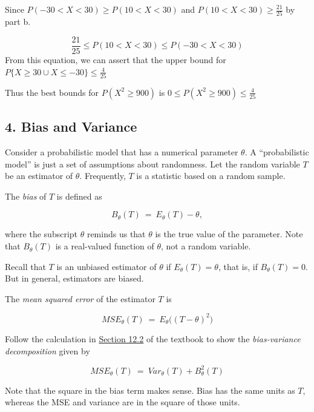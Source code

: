 \documentclass[11pt]{article}
\begin{document}
Since $ P(-30 < X < 30) \ge P(10 < X < 30) $ and $P(10 < X < 30) \ge \frac{21}{25}$ by part b. 

\[
\frac{21}{25} \le P(10 < X < 30) \le P(-30 < X < 30)
\]
From this equation, we can assert that the upper bound for $ P\{X\ge30\cup X \le -30\} \le \frac{4}{25} $ 


Thus the best bounds for $ P(X^{2} \ge 900) $ is $ \boxed{0 \le P(X^{2}\ge 900) \le \frac{4}{25}} $  
    \newpage

    \subsection*{4. Bias and Variance}\label{bias-and-variance}

Consider a probabilistic model that has a numerical parameter
\(\theta\). A ``probabilistic model'' is just a set of assumptions about
randomness. Let the random variable \(T\) be an estimator of \(\theta\).
Frequently, \(T\) is a statistic based on a random sample.

The \emph{bias} of \(T\) is defined as

\[
B_\theta (T) ~ = ~ E_\theta (T) - \theta,
\]

where the subscript \(\theta\) reminds us that \(\theta\) is the true
value of the parameter. Note that \(B_\theta(T)\) is a real-valued
function of \(\theta\), not a random variable.

Recall that \(T\) is an unbiased estimator of \(\theta\) if
\(E_\theta(T) = \theta\), that is, if \(B_\theta(T) = 0\). But in
general, estimators are biased.

The \emph{mean squared error} of the estimator \(T\) is

\[ 
MSE_\theta (T) ~ = ~ E_\theta \big( (T - \theta)^2 \big)
\]

Follow the calculation in
\href{https://data140.org/textbook/content/chapter-12/prediction-and-estimation/}{Section
12.2} of the textbook to show the \emph{bias-variance decomposition}
given by

\[
MSE_\theta (T) ~ = ~ Var_\theta(T) + B_\theta^2(T)
\]

Note that the square in the bias term makes sense. Bias has the same
units as \(T\), whereas the MSE and variance are in the square of those
units.
\end{document}
